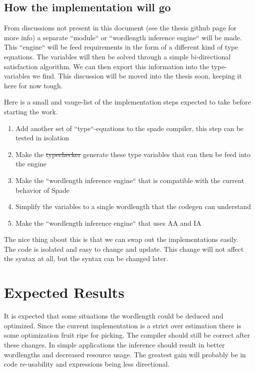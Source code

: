 \documentclass[msc,lith,english]{liuthesis}
\providecommand{\DIFadd}[1]{{\protect\color{blue}\uwave{#1}}} %
\providecommand{\DIFdel}[1]{{\protect\color{red}\sout{#1}}}                      %
\providecommand{\DIFaddbegin}{} %
\providecommand{\DIFaddend}{} %
\providecommand{\DIFdelbegin}{} %
\providecommand{\DIFdelend}{} %
\begin{document}
\subsection{How the implementation will go}
From discussions not present in this document (see the thesis github page for more info) a separate ``module`` or ``wordlength inference engine`` will be made. This ``engine`` will be feed requirements in the form of a different kind of type equations. The variables will then be solved through a simple bi-directional satisfaction algorithm. We can then export this information into the type-variables we find. This discussion will be moved into the thesis soon, keeping it here for now tough. 

Here is a small and vauge-list of the implementation steps expected to take before starting the work.

\begin{enumerate}
    \item Add another set of ``type``-equations to the spade compiler, this step can be tested in isolation
    \item Make the \DIFdelbegin \DIFdel{typechecker }\DIFdelend \DIFaddbegin \DIFadd{type checker }\DIFaddend generate these type variables that can then be feed into the engine
    \item Make the ``wordlength inference engine`` that is compatible with the current behavior of Spade
    \item Simplify the variables to a single wordlength that the codegen can understand
    \item Make the ``wordlength inference engine`` that uses AA and IA
\end{enumerate}

The nice thing about this is that we can swap out the implementations easily. The code is isolated and easy to change and update. This change will not affect the syntax at all, but the syntax can be changed later.

\section{Expected Results}
It is expected that some situations the wordlength could be deduced and optimized. Since the current implementation is a strict over estimation there is some optimization fruit ripe for picking. The compiler should still be correct after these changes. In simple applications the inference should result in better wordlengths and decreased resource usage. The greatest gain will probably be in code re-usability and expressions being less directional.
\end{document}
